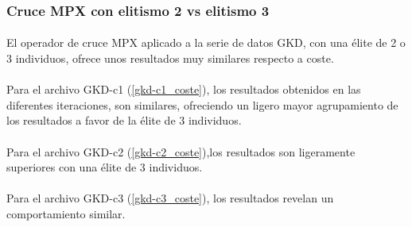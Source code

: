 	
	\subsubsection{Cruce MPX con elitismo 2 vs elitismo 3}
	
	\paragraph{} El operador de cruce MPX aplicado a la serie de datos GKD, con una élite de 2 o 3 individuos, ofrece unos resultados muy similares respecto a coste.
	
	\paragraph{} Para el archivo GKD-c1  (\ref{gkd-c1_coste}), los resultados obtenidos en las diferentes iteraciones, son similares, ofreciendo un ligero mayor agrupamiento de los resultados a favor de la élite de 3 individuos.
	
	\paragraph{} Para el archivo GKD-c2  (\ref{gkd-c2_coste}),los resultados son ligeramente superiores con una élite de 3 individuos.
	
	\paragraph{} Para el archivo GKD-c3  (\ref{gkd-c3_coste}), los resultados revelan un comportamiento similar.
	
